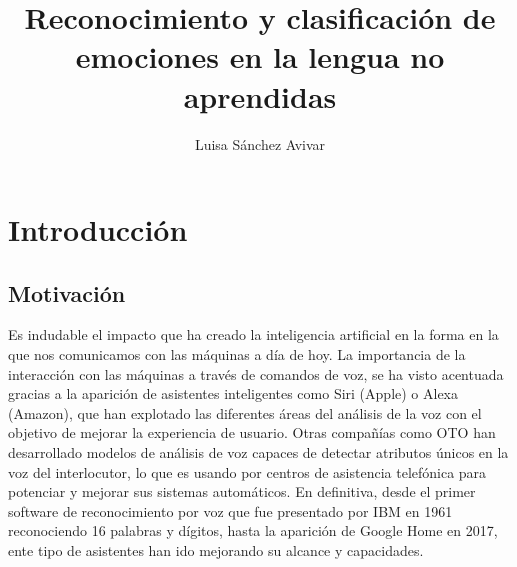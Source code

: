 \documentclass[11pt,a4paper,spanish]{book}
\begin{document}
	\title{Reconocimiento y clasificación de emociones en la lengua no aprendidas}
	\author{Luisa Sánchez Avivar}
	
	
	\mainmatter
	\chapter{Introducción}
	
	
	\section{Motivación}
	\begin{comment}
		Affective computing opens a new area of research in computer science with the aim to improve the way how humans and machines interact. Recognition of human emotions by machines is becoming a significant focus in recent research in different disciplines related to information sciences and Human-Computer Interaction (HCI)Humans verbally communicate by speech and
		language. This enables faster sharing of messages, conveying of ideas and spreading of inventions. Communication between humans is actually not just what humans say, but also how they say it. Furthermore, facial expressions, as a part of non-verbal communication, are responsible for about 55%
		S.Lugovic
	\end{comment}
	Es indudable el impacto que ha creado la inteligencia artificial en la forma en la que nos comunicamos con las máquinas a día de hoy. La importancia de la interacción con las máquinas a través de comandos de voz, se ha visto acentuada gracias a la aparición de asistentes inteligentes como Siri (Apple) o Alexa (Amazon), que han explotado las diferentes áreas del análisis de la voz con el objetivo de mejorar la experiencia de usuario. Otras compañías como OTO han desarrollado modelos de análisis de voz capaces de detectar atributos únicos en la voz del interlocutor, lo que es usando por centros de asistencia telefónica para potenciar y mejorar sus sistemas automáticos.
	En definitiva, desde el primer software de reconocimiento por voz que fue presentado por IBM en 1961 reconociendo 16 palabras y dígitos, hasta la aparición de Google Home en 2017, ente tipo de asistentes han ido mejorando su alcance y capacidades.\\
	
\end{document}

